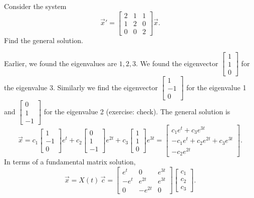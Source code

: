 \begin{example}
Consider the system
\begin{equation*}
{\vec{x}}'
=
\begin{bmatrix}
2 & 1 & 1 \\
1 & 2 & 0 \\
0 & 0 & 2
\end{bmatrix}
\vec{x} .
\end{equation*}
Find the general solution.

Earlier, we found the eigenvalues are $1,2,3$.  We found the eigenvector
$\left[ \begin{smallmatrix} 1 \\ 1 \\ 0 \end{smallmatrix} \right]$
for the eigenvalue 3.  Similarly
we find the eigenvector 
$\left[ \begin{smallmatrix} 1 \\ -1 \\ 0 \end{smallmatrix} \right]$
for the eigenvalue 1 and 
$\left[ \begin{smallmatrix} 0 \\ 1 \\ -1 \end{smallmatrix} \right]$
for the eigenvalue 2 (exercise: check).
The general solution is
\begin{equation*}
\vec{x} =
c_1
\begin{bmatrix}
1 \\ -1 \\ 0
\end{bmatrix}
e^t
+
c_2
\begin{bmatrix}
0 \\ 1 \\ -1
\end{bmatrix}
e^{2t}
+
c_3
\begin{bmatrix}
1 \\ 1 \\ 0
\end{bmatrix}
e^{3t} 
=
\begin{bmatrix}
c_1 e^t+c_3 e^{3t} \\ -c_1 e^t + c_2 e^{2t} + c_3 e^{3t} \\ - c_2 e^{2t}
\end{bmatrix} .
\end{equation*}
In terms of a fundamental matrix solution,
\begin{equation*}
\vec{x} = X(t)\, \vec{c}
=
\begin{bmatrix}
e^t & 0 & e^{3t} \\
-e^t & e^{2t} & e^{3t} \\
0 & -e^{2t} & 0
\end{bmatrix}
\begin{bmatrix}
c_1 \\ c_2 \\ c_3
\end{bmatrix} .
\end{equation*}
\end{example}

